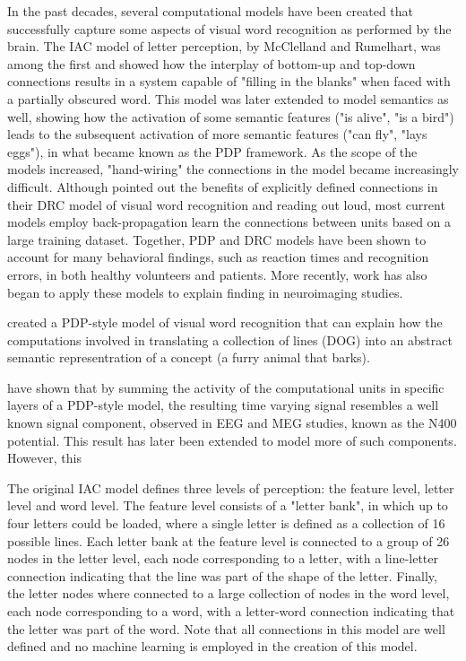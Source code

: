 \documentclass[a4paper, 10pt]{vanvliet_paper}
\newcommand{\word}[1]{\textsf{\scriptsize{}#1}}
\begin{document}
In the past decades, several computational models have been created that successfully capture some aspects of visual word recognition as performed by the brain.
The \gls{IAC} model of letter perception, by McClelland and Rumelhart\cite{McClelland1981, Rumelhart1982}, was among the first and showed how the interplay of bottom-up and top-down connections results in a system capable of "filling in the blanks" when faced with a partially obscured word.
This model was later extended to model semantics as well, showing how the activation of some semantic features ("is alive", "is a bird") leads to the subsequent activation of more semantic features ("can fly", "lays eggs"), in what became known as the \gls{PDP} framework\cite{McClelland2003}.
As the scope of the models increased, "hand-wiring" the connections in the model became increasingly difficult.
Although \textcite{Coltheart2001} pointed out the benefits of explicitly defined connections in their \gls{DRC} model of visual word recognition and reading out loud, most current models employ back-propagation learn the connections between units based on a large training dataset.
Together, \gls{PDP} and \gls{DRC} models have been shown to account for many behavioral findings, such as reaction times and recognition errors, in both healthy volunteers and patients\cite{McLeod2000, McClelland2003, Perry2007}.
More recently, work has also began to apply these models to explain finding in neuroimaging studies.

\textcite{Laszlo2012} created a \gls{PDP}-style model of visual word recognition that can explain how the computations involved in translating a collection of lines (\word{DOG}) into an abstract semantic representration of a concept (a furry animal that barks).

have shown that by summing the activity of the computational units in specific layers of a \gls{PDP}-style model, the resulting time varying signal resembles a well known signal component, observed in \gls{EEG} and \gls{MEG} studies, known as the N400 potential\cite{Kutas2011}.
This result has later been extended to model more of such components\cite{Laszlo2014}.
However, this 

The original \gls{IAC} model\cite{McClelland1981} defines three levels of perception: the feature level, letter level and word level.
The feature level consists of a "letter bank", in which up to four letters could be loaded, where a single letter is defined as a collection of 16 possible lines.
Each letter bank at the feature level is connected to a group of 26 nodes in the letter level, each node corresponding to a letter, with a line-letter connection indicating that the line was part of the shape of the letter.
Finally, the letter nodes where connected to a large collection of nodes in the word level, each node corresponding to a word, with a letter-word connection indicating that the letter was part of the word.
Note that all connections in this model are well defined and no machine learning is employed in the creation of this model.
\end{document}
